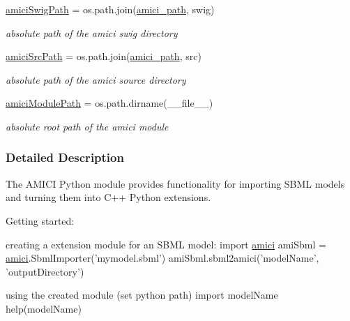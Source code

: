 \begin{DoxyCompactItemize}
\mbox{\hyperlink{namespaceamici_a1e71ffa8e12718e578ac6b974c5a6cd5}{amici\+Swig\+Path}} = os.\+path.\+join(\mbox{\hyperlink{namespaceamici_a6b3f3dfe4601baaa0bf0a02b9a01a896}{amici\+\_\+path}}, \textquotesingle{}swig\textquotesingle{})
\begin{DoxyCompactList}\small\item\em absolute path of the amici swig directory \end{DoxyCompactList}\item 
\mbox{\label{namespaceamici_a2dfea9ae83d246c055e3ee84c9c5e9ac}} 
\mbox{\hyperlink{namespaceamici_a2dfea9ae83d246c055e3ee84c9c5e9ac}{amici\+Src\+Path}} = os.\+path.\+join(\mbox{\hyperlink{namespaceamici_a6b3f3dfe4601baaa0bf0a02b9a01a896}{amici\+\_\+path}}, \textquotesingle{}src\textquotesingle{})
\begin{DoxyCompactList}\small\item\em absolute path of the amici source directory \end{DoxyCompactList}\item 
\mbox{\label{namespaceamici_a54d4969414b0861bd938470a7c7bbd20}} 
\mbox{\hyperlink{namespaceamici_a54d4969414b0861bd938470a7c7bbd20}{amici\+Module\+Path}} = os.\+path.\+dirname(\+\_\+\+\_\+file\+\_\+\+\_\+)
\begin{DoxyCompactList}\small\item\em absolute root path of the amici module \end{DoxyCompactList}\end{DoxyCompactItemize}


\subsubsection{Detailed Description}
The A\+M\+I\+CI Python module provides functionality for importing S\+B\+ML models and turning them into C++ Python extensions.

Getting started\+: 
\begin{DoxyCode}
 creating a extension module \textcolor{keywordflow}{for} an SBML model:
\textcolor{keyword}{import} \mbox{\hyperlink{namespaceamici}{amici}}
amiSbml = \mbox{\hyperlink{namespaceamici}{amici}}.SbmlImporter(\textcolor{stringliteral}{'mymodel.sbml'})
amiSbml.sbml2amici(\textcolor{stringliteral}{'modelName'}, \textcolor{stringliteral}{'outputDirectory'})

 \textcolor{keyword}{using} the created module (\textcolor{keyword}{set} python path)
\textcolor{keyword}{import} modelName
help(modelName)
\end{DoxyCode}
 

